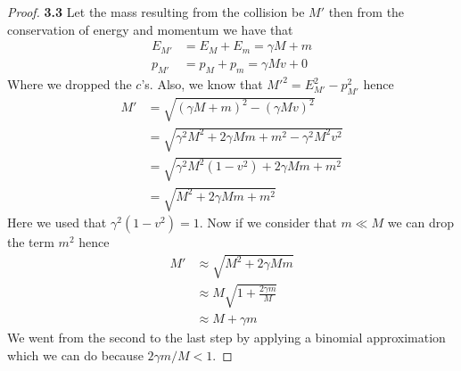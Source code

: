 \documentclass[11pt]{article}
\theoremstyle{definition}
\begin{document}
\begin{proof}{\textbf{3.3}}
    Let the mass resulting from the collision be $M'$ then from the
    conservation of energy and momentum we have that
    \begin{align*}
        E_{M'} &= E_{M} + E_{m} = \gamma M + m\\
        p_{M'} &= p_{M} + p_{m} = \gamma M v + 0
    \end{align*}
    Where we dropped the $c$'s. Also, we know that $M'^2 = E_{M'}^2 - p_{M'}^2$
    hence
    \begin{align*}
        M' &= \sqrt{(\gamma M + m)^2 - (\gamma M v)^2}\\
           &= \sqrt{\gamma^2 M^2 + 2\gamma M m +m^2 - \gamma^2 M^2 v^2}\\
           &= \sqrt{\gamma^2 M^2(1 - v^2) + 2\gamma M m + m^2}\\
           &= \sqrt{M^2 + 2\gamma M m + m^2}
    \end{align*}
    Here we used that $\gamma^2 (1 - v^2) = 1$. Now if we consider that
    $m \ll M$ we can drop the term $m^2$ hence
    \begin{align*}
        M' &\approx \sqrt{M^2 + 2\gamma M m}\\
           &\approx M\sqrt{1 + \frac{2\gamma m}{M}}\\
           &\approx M + \gamma m
    \end{align*}
    We went from the second to the last step by applying a binomial
    approximation which we can do because $2\gamma m/M < 1$.
\end{proof}
\cleardoublepage
\end{document}
